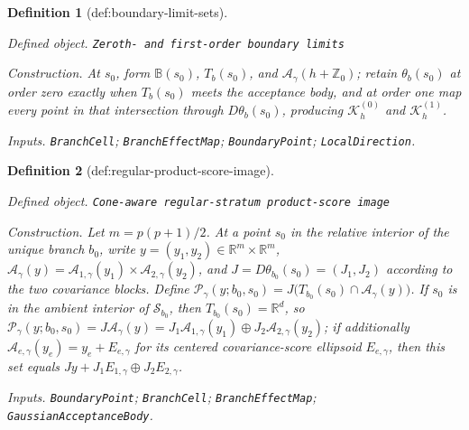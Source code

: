 \documentclass{article}
\newtheorem{definition}{Definition}
\begin{document}
\begin{definition}[def:boundary-limit-sets]\label{def:boundary-limit-sets}
\par\smallskip\noindent\emph{Defined object.} \texttt{Zeroth-\allowbreak{} and first-\allowbreak{}order boundary limits}
\par\smallskip\noindent\emph{Construction.} At \(s_0\), form \(\mathbb B(s_0)\), \(T_b(s_0)\), and \(\mathcal A_{\gamma}(h+\mathbb Z_0)\); retain \(\theta_b(s_0)\) at order zero exactly when \(T_b(s_0)\) meets the acceptance body, and at order one map every point in that intersection through \(D\theta_b(s_0)\), producing \(\mathcal K_h^{(0)}\) and \(\mathcal K_h^{(1)}\).
\par\smallskip\noindent\emph{Inputs.} \texttt{BranchCell}; \texttt{BranchEffectMap}; \texttt{BoundaryPoint}; \texttt{LocalDirection}.
\end{definition}

\begin{definition}[def:regular-product-score-image]\label{def:regular-product-score-image}
\par\smallskip\noindent\emph{Defined object.} \texttt{Cone-\allowbreak{}aware regular-\allowbreak{}stratum product-\allowbreak{}score image}
\par\smallskip\noindent\emph{Construction.} Let \(m=p(p+1)/2\). At a point \(s_0\) in the relative interior of the unique branch \(b_0\), write \(y=(y_1,y_2)\in\mathbb R^m\times\mathbb R^m\), \(\mathcal A_{\gamma}(y)=\mathcal A_{1,\gamma}(y_1)\times\mathcal A_{2,\gamma}(y_2)\), and \(J=D\theta_{b_0}(s_0)=(J_1,J_2)\) according to the two covariance blocks. Define \(\mathcal P_{\gamma}(y;b_0,s_0)=J\bigl(T_{b_0}(s_0)\cap\mathcal A_{\gamma}(y)\bigr)\). If \(s_0\) is in the ambient interior of \(\mathcal S_{b_0}\), then \(T_{b_0}(s_0)=\mathbb R^d\), so \(\mathcal P_{\gamma}(y;b_0,s_0)=J\mathcal A_{\gamma}(y)=J_1\mathcal A_{1,\gamma}(y_1)\oplus J_2\mathcal A_{2,\gamma}(y_2)\); if additionally \(\mathcal A_{e,\gamma}(y_e)=y_e+E_{e,\gamma}\) for its centered covariance-score ellipsoid \(E_{e,\gamma}\), then this set equals \(Jy+J_1E_{1,\gamma}\oplus J_2E_{2,\gamma}\).
\par\smallskip\noindent\emph{Inputs.} \texttt{BoundaryPoint}; \texttt{BranchCell}; \texttt{BranchEffectMap}; \texttt{GaussianAcceptanceBody}.
\end{definition}
\end{document}
